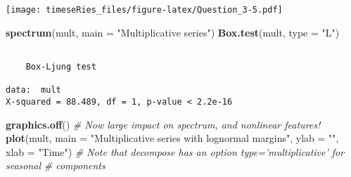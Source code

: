 \documentclass[]{book}
\newenvironment{Shaded}{\begin{snugshade}}{\end{snugshade}}
\newcommand{\KeywordTok}[1]{\textcolor[rgb]{0.13,0.29,0.53}{\textbf{#1}}}
\newcommand{\DataTypeTok}[1]{\textcolor[rgb]{0.13,0.29,0.53}{#1}}
\newcommand{\DecValTok}[1]{\textcolor[rgb]{0.00,0.00,0.81}{#1}}
\newcommand{\StringTok}[1]{\textcolor[rgb]{0.31,0.60,0.02}{#1}}
\newcommand{\CommentTok}[1]{\textcolor[rgb]{0.56,0.35,0.01}{\textit{#1}}}
\newcommand{\ControlFlowTok}[1]{\textcolor[rgb]{0.13,0.29,0.53}{\textbf{#1}}}
\newcommand{\OperatorTok}[1]{\textcolor[rgb]{0.81,0.36,0.00}{\textbf{#1}}}
\newcommand{\NormalTok}[1]{#1}
\begin{document}
\begin{Shaded}
\end{Shaded}

\texttt{[image: timeseRies\_files/figure-latex/Question\_3-5.pdf]}

\begin{Shaded}
\begin{Highlighting}[]
\KeywordTok{spectrum}\NormalTok{(mult, }\DataTypeTok{main =} \StringTok{"Multiplicative series"}\NormalTok{)}
\KeywordTok{Box.test}\NormalTok{(mult, }\DataTypeTok{type =} \StringTok{"L"}\NormalTok{)}
\end{Highlighting}
\end{Shaded}

\begin{verbatim}

    Box-Ljung test

data:  mult
X-squared = 88.489, df = 1, p-value < 2.2e-16
\end{verbatim}

\begin{Shaded}
\begin{Highlighting}[]
\KeywordTok{graphics.off}\NormalTok{()}
\CommentTok{# Now large impact on spectrum, and nonlinear features!}
\KeywordTok{plot}\NormalTok{(mult, }\DataTypeTok{main =} \StringTok{"Multiplicative series with lognormal margins"}\NormalTok{, }\DataTypeTok{ylab =} \StringTok{""}\NormalTok{, }
    \DataTypeTok{xlab =} \StringTok{"Time"}\NormalTok{)}
\CommentTok{# Note that decompose has an option type='multiplicative' for seasonal}
\CommentTok{# components}
\end{Highlighting}
\end{Shaded}
\end{document}
